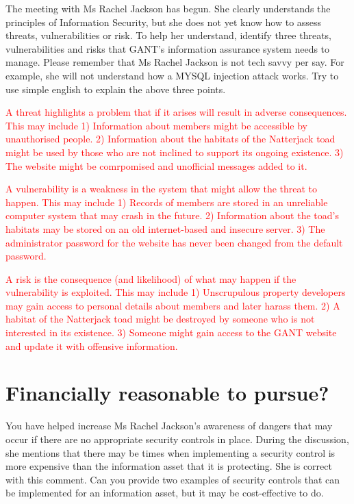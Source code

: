 \documentclass{llncs}
\begin{document}
The meeting with Ms Rachel Jackson has begun. 
She clearly understands the principles of Information Security, but she does not yet know how to assess threats, vulnerabilities or risk. 
To help her understand, identify three threats, vulnerabilities and risks that GANT's information assurance system needs to manage. 
Please remember that Ms Rachel Jackson is not tech savvy per say.
For example, she will not understand how a MYSQL injection attack works.
Try to use simple english to explain the above three points. 

\textcolor{red}{A threat highlights a problem that if it arises will result in adverse consequences. This may include 1) Information about members might be accessible by unauthorised people. 2) Information about the habitats of the Natterjack toad might be used by those who are not inclined to support its ongoing existence. 3) The website might be comrpomised and unofficial messages added to it. }

\textcolor{red}{A vulnerability is a weakness in the system that might allow the threat to happen.  This may include 1) Records of members are stored in an unreliable computer system that may crash in the future. 2) Information about the toad's habitats may be stored on an old internet-based and insecure server. 3) The administrator password for the website has never been changed from the default password. }

\textcolor{red}{A risk is the consequence (and likelihood) of what may happen if the vulnerability is exploited. This may include 1) Unscrupulous property developers may gain access to personal details about members and later harass them. 2) A habitat of the Natterjack toad might be destroyed by someone who is not interested in its existence. 3) Someone might gain access to the GANT website and update it with offensive information.}


\section{Financially reasonable to pursue? } 

You have helped increase Ms Rachel Jackson's awareness of dangers that may occur if there are no appropriate security controls in place.
During the discussion, she mentions that there may be times when implementing a security control is more expensive than the information asset that it is protecting. 
She is correct with this comment. 
Can you provide two examples of security controls that can be implemented for an information asset, but it may be cost-effective to do. 
\end{document}
